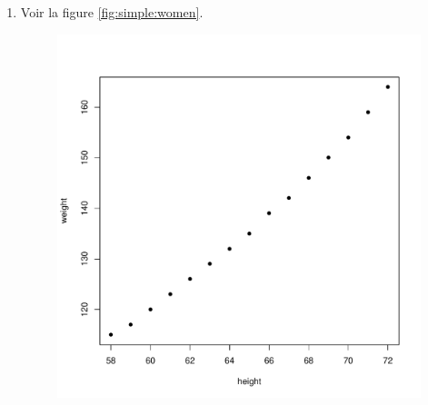 \begin{solution}{2.3}
    \begin{enumerate}
    \item Voir la figure \ref{fig:simple:women}.
      \begin{figure}
        \centering
\begin{knitrout}
\color{fgcolor}\begin{kframe}
\begin{alltt}
 \hlopt{~}     \hlstd{=} \hlstd{)}
\end{alltt}
\end{kframe}
\includegraphics[width=\maxwidth]{figure/unnamed-chunk-15-1}


\end{knitrout}
\end{figure}
\end{enumerate}
\end{solution}

